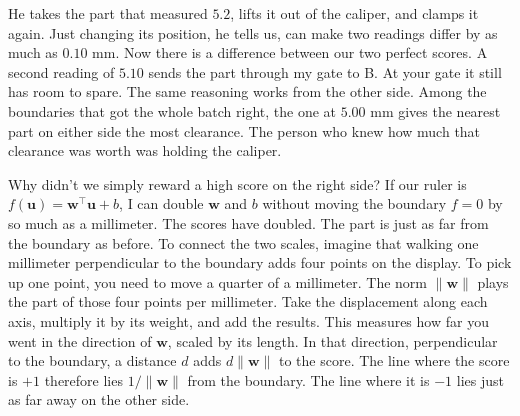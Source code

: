 He takes the part that measured $5.2$, lifts it out of the caliper, and clamps it again. Just changing its position, he tells us, can make two readings differ by as much as $0.10$ mm. Now there is a difference between our two perfect scores. A second reading of $5.10$ sends the part through my gate to B. At your gate it still has room to spare. The same reasoning works from the other side. Among the boundaries that got the whole batch right, the one at $5.00$ mm gives the nearest part on either side the most clearance. The person who knew how much that clearance was worth was holding the caliper.

Why didn't we simply reward a high score on the right side? If our ruler is $f(\boldsymbol u)=\boldsymbol w^\top\boldsymbol u+b$, I can double $\boldsymbol w$ and $b$ without moving the boundary $f=0$ by so much as a millimeter. The scores have doubled. The part is just as far from the boundary as before. To connect the two scales, imagine that walking one millimeter perpendicular to the boundary adds four points on the display. To pick up one point, you need to move a quarter of a millimeter. The norm $\lVert\boldsymbol w\rVert$ plays the part of those four points per millimeter. Take the displacement along each axis, multiply it by its weight, and add the results. This measures how far you went in the direction of $\boldsymbol w$, scaled by its length. In that direction, perpendicular to the boundary, a distance $d$ adds $d\lVert\boldsymbol w\rVert$ to the score. The line where the score is $+1$ therefore lies $1/\lVert\boldsymbol w\rVert$ from the boundary. The line where it is $-1$ lies just as far away on the other side.

